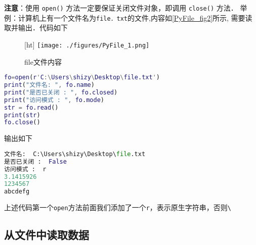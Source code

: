 \textbf{注意}：使用 \verb|open()| 方法一定要保证关闭文件对象，即调用 \verb|close()| 方法． 举例：计算机上有一个文件名为\verb|file．txt|的文件,内容如\autoref{PyFile_fig2}所示, 需要读取并输出．代码如下
\begin{figure}\label{PyFile_fig2}[ht]
\centering
\texttt{[image: ./figures/PyFile\_1.png]}
\caption{file文件内容} \label{PyFile_fig1}
\end{figure}
\begin{lstlisting}[language=matlab]
fo=open(r'C:\Users\shizy\Desktop\file.txt')
print("文件名: ", fo.name)
print("是否已关闭 : ", fo.closed)
print("访问模式 : ", fo.mode)
str = fo.read()
print(str)
fo.close()
\end{lstlisting}
输出如下
\begin{lstlisting}[language=python]
文件名:  C:\Users\shizy\Desktop\file.txt
是否已关闭 :  False
访问模式 :  r
3.1415926
1234567
abcdefg
\end{lstlisting}
上述代码第一个\verb|open|方法前面我们添加了一个\verb|r|，表示原生字符串，否则\verb|\|

\subsection{从文件中读取数据}
